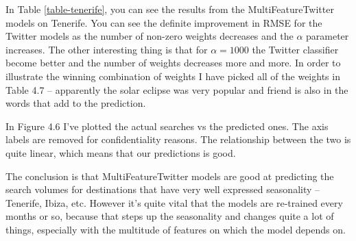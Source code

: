 \documentclass[minf,twoside,singlespacing,parskip,frontabs,notimes,11pt]{infthesis}
\begin{document}
In Table \ref{table-tenerife}, you can see the results from the MultiFeatureTwitter models on Tenerife. You can see the definite improvement in RMSE for the Twitter models as the number of non-zero weights decreases and the $\alpha$ parameter increases. The other interesting thing is that for $\alpha=1000$ the Twitter classifier become better and the number of weights decreases more and more. In order to illustrate the winning combination of weights I have picked all of the weights in Table 4.7 -- apparently the solar eclipse was very popular and friend is also in the words that add to the prediction. 

In Figure 4.6 I've plotted the actual searches vs the predicted ones. The axis labels are removed for confidentiality reasons. The relationship between the two is quite linear, which means that our predictions is good. 

The conclusion is that MultiFeatureTwitter models are good at predicting the search volumes for destinations that have very well expressed seasonality -- Tenerife, Ibiza, etc. However it's quite vital that the models are re-trained every months or so, because that steps up the seasonality and changes quite a lot of things, especially with the multitude of features on which the model depends on. 
\end{document}
